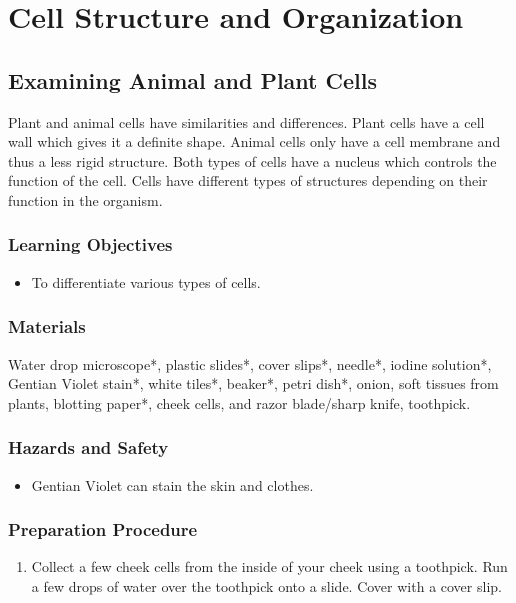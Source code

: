 \section{Cell Structure and Organization}
\subsection{Examining Animal and Plant Cells}
Plant and animal cells have similarities and differences. Plant cells have a cell wall which gives it a definite shape. Animal cells only have a cell membrane and thus a less rigid structure. Both types of cells have a nucleus which controls the function of the cell. Cells have different types of structures depending on their function in the organism.

\subsubsection*{Learning Objectives}
\begin{itemize}
\item{To differentiate various types of cells.}
\end{itemize}

\subsubsection*{Materials}
Water drop microscope*, plastic slides*, cover slips*, needle*, iodine solution*, Gentian Violet stain*, white tiles*, beaker*, petri dish*, onion, soft tissues from plants, blotting paper*, cheek cells, and razor blade/sharp knife, toothpick.

\subsubsection*{Hazards and Safety}
\begin{itemize}
\item{Gentian Violet can stain the skin and clothes.}
\end{itemize}

\subsubsection*{Preparation Procedure}
\begin{enumerate}
\item{Collect a few cheek cells from the inside of your cheek using a toothpick. Run a few drops of water over the toothpick onto a slide. Cover with a cover slip.}
\end{enumerate}

